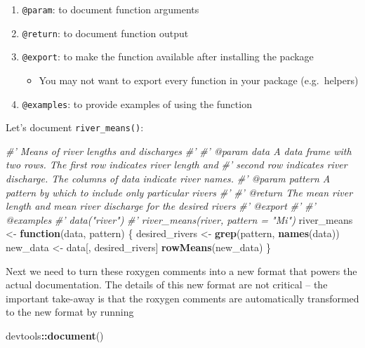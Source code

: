 \documentclass[
]{book}
\newenvironment{Shaded}{\begin{snugshade}}{\end{snugshade}}
\newcommand{\CommentTok}[1]{\textcolor[rgb]{0.56,0.35,0.01}{\textit{#1}}}
\newcommand{\ControlFlowTok}[1]{\textcolor[rgb]{0.13,0.29,0.53}{\textbf{#1}}}
\newcommand{\KeywordTok}[1]{\textcolor[rgb]{0.13,0.29,0.53}{\textbf{#1}}}
\newcommand{\NormalTok}[1]{#1}
\newcommand{\OperatorTok}[1]{\textcolor[rgb]{0.81,0.36,0.00}{\textbf{#1}}}
\newcommand{\StringTok}[1]{\textcolor[rgb]{0.31,0.60,0.02}{#1}}
\providecommand{\tightlist}{%
  \setlength{\itemsep}{0pt}\setlength{\parskip}{0pt}}
\begin{document}
\begin{enumerate}
\def\labelenumi{\arabic{enumi}.}
\tightlist
\item
  \texttt{@param}: to document function arguments
\item
  \texttt{@return}: to document function output
\item
  \texttt{@export}: to make the function available after installing the package

  \begin{itemize}
  \tightlist
  \item
    You may not want to export every function in your package (e.g.~helpers)
  \end{itemize}
\item
  \texttt{@examples}: to provide examples of using the function
\end{enumerate}

Let's document \texttt{river\_means()}:

\begin{Shaded}
\begin{Highlighting}[]
\CommentTok{#' Means of river lengths and discharges}
\CommentTok{#'}
\CommentTok{#' @param data A data frame with two rows. The first row indicates river length and}
\CommentTok{#'   second row indicates river discharge. The columns of data indicate river names.}
\CommentTok{#' @param pattern A pattern by which to include only particular rivers}
\CommentTok{#'}
\CommentTok{#' @return The mean river length and mean river discharge for the desired rivers}
\CommentTok{#' @export}
\CommentTok{#'}
\CommentTok{#' @examples}
\CommentTok{#' data("river")}
\CommentTok{#' river_means(river, pattern = "Mi")}
\NormalTok{river_means <-}\StringTok{ }\ControlFlowTok{function}\NormalTok{(data, pattern) \{}
\NormalTok{  desired_rivers <-}\StringTok{ }\KeywordTok{grep}\NormalTok{(pattern, }\KeywordTok{names}\NormalTok{(data))}
\NormalTok{  new_data <-}\StringTok{ }\NormalTok{data[, desired_rivers]}
  \KeywordTok{rowMeans}\NormalTok{(new_data)}
\NormalTok{\}}
\end{Highlighting}
\end{Shaded}

Next we need to turn these roxygen comments into a new format that powers the actual documentation. The details of this new format are not critical -- the important take-away is that the roxygen comments are automatically transformed to the new format by running

\begin{Shaded}
\begin{Highlighting}[]
\NormalTok{devtools}\OperatorTok{::}\KeywordTok{document}\NormalTok{()}
\end{Highlighting}
\end{Shaded}
\end{document}
